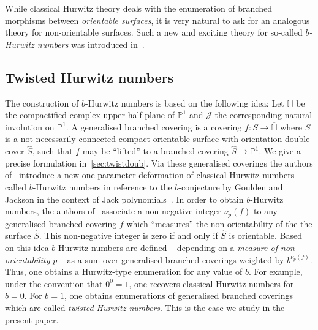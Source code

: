 \documentclass[10pt]{amsart}
\theoremstyle{plain}
\theoremstyle{definition}
\theoremstyle{definition}
\theoremstyle{plain}
\theoremstyle{plain}
\theoremstyle{remark}
\theoremstyle{plain}
\theoremstyle{plain}
\begin{document}
While classical Hurwitz theory deals with the enumeration of branched morphisms between \textit{orientable surfaces}, it is very natural to ask for an analogous theory for non-orientable surfaces. Such a new and exciting theory for so-called \textit{$b$-Hurwitz numbers} was introduced in~\cite{chapuy2020non}.

\subsection{Twisted Hurwitz numbers}\label{sec-twistedsingle}
The construction of $b$-Hurwitz numbers is based on the following idea:  Let $\overline{\mathbb{H}}$ be the compactified complex upper half-plane of $\mathbb{P}^1$ and $\mathcal{J}$ the corresponding natural involution on $\mathbb{P}^1$. A generalised branched covering is a covering $f\colon S\to\overline{\mathbb{H}}$ where $S$ is a not-necessarily connected compact orientable surface with orientation double cover $\hat{S}$, such that $f$ may be ``lifted'' to a branched covering $\hat{S}\to\mathbb{P}^1$. We give a precise formulation in~\cref{sec:twistdoub}. Via these generalised coverings the authors of~\cite{chapuy2020non} introduce a new one-parameter deformation of classical Hurwitz numbers called $b$-Hurwitz numbers in reference to the $b$-conjecture by Goulden and Jackson in the context of Jack polynomials~\cite{goulden1996connection}. In order to obtain $b$-Hurwitz numbers, the authors of~\cite{chapuy2020non} associate a non-negative integer $\nu_p(f)$ to any generalised branched covering $f$ which ``measures'' the non-orientability of the the surface $\hat{S}$. This non-negative integer is zero if and only if $\hat{S}$ is orientable. Based on this idea $b$-Hurwitz numbers are defined -- depending on a \textit{measure of non-orientability} $p$ -- as a sum over generalised branched coverings weighted by $b^{\nu_p(f)}$. Thus, one obtains a Hurwitz-type enumeration for any value of $b$. For example, under the convention that $0^0=1$, one  recovers classical Hurwitz numbers for $b=0$. For $b=1$, one obtains enumerations of generalised branched coverings which are called \textit{twisted Hurwitz numbers}. This is the case we study in the present paper.
\end{document}
